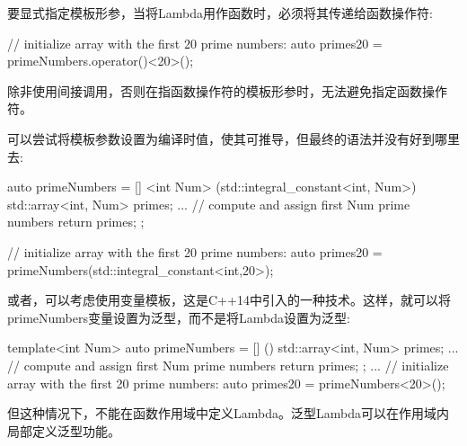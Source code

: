 要显式指定模板形参，当将Lambda用作函数时，必须将其传递给函数操作符:

\begin{cpp}
// initialize array with the first 20 prime numbers:
auto primes20 = primeNumbers.operator()<20>();
\end{cpp}

除非使用间接调用，否则在指函数操作符的模板形参时，无法避免指定函数操作符。

可以尝试将模板参数设置为编译时值，使其可推导，但最终的语法并没有好到哪里去:

\begin{cpp}
auto primeNumbers = [] <int Num> (std::integral_constant<int, Num>) {
						std::array<int, Num> primes{};
						... // compute and assign first Num prime numbers
						return primes;
					};

// initialize array with the first 20 prime numbers:
auto primes20 = primeNumbers(std::integral_constant<int,20>{});
\end{cpp}

或者，可以考虑使用变量模板，这是C++14中引入的一种技术。这样，就可以将primeNumbers变量设置为泛型，而不是将Lambda设置为泛型:

\begin{cpp}
template<int Num>
auto primeNumbers = [] () {
						std::array<int, Num> primes{};
						... // compute and assign first Num prime numbers
						return primes;
					};
...
// initialize array with the first 20 prime numbers:
auto primes20 = primeNumbers<20>();
\end{cpp}

但这种情况下，不能在函数作用域中定义Lambda。泛型Lambda可以在作用域内局部定义泛型功能。








